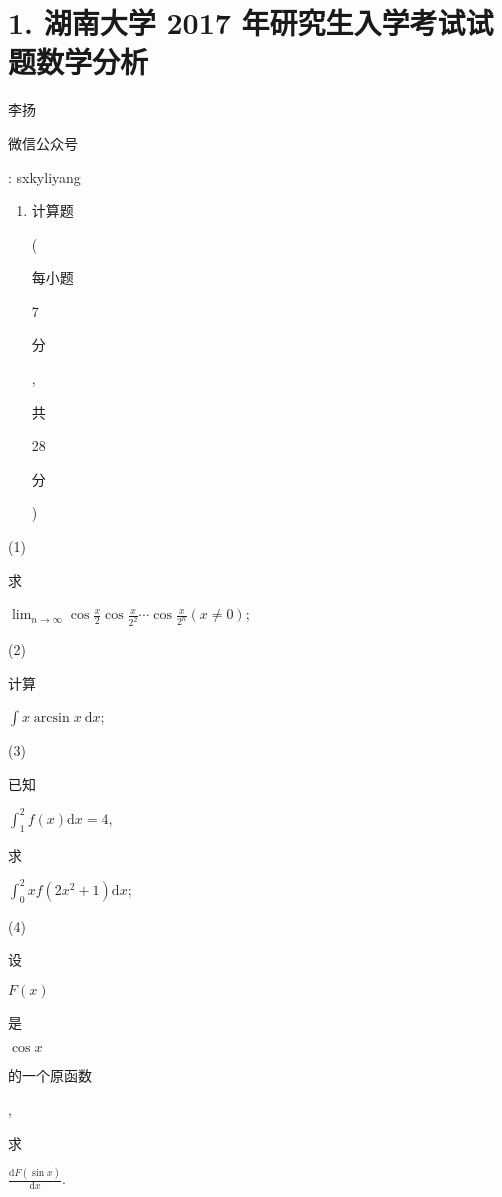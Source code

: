 \documentclass[10pt]{article}
\begin{document}
\section{1. 湖南大学 2017 年研究生入学考试试题数学分析}
\begin{CJK}{UTF8}{mj}李扬\end{CJK}

\begin{CJK}{UTF8}{mj}微信公众号\end{CJK}: sxkyliyang

\begin{enumerate}
  \item \begin{CJK}{UTF8}{mj}计算题\end{CJK}(\begin{CJK}{UTF8}{mj}每小题\end{CJK} 7 \begin{CJK}{UTF8}{mj}分\end{CJK}, \begin{CJK}{UTF8}{mj}共\end{CJK} 28 \begin{CJK}{UTF8}{mj}分\end{CJK})
\end{enumerate}
(1) \begin{CJK}{UTF8}{mj}求\end{CJK} $\lim _{n \rightarrow \infty} \cos \frac{x}{2} \cos \frac{x}{2^{2}} \cdots \cos \frac{x}{2^{n}}(x \neq 0)$;

(2) \begin{CJK}{UTF8}{mj}计算\end{CJK} $\int x \arcsin x \mathrm{~d} x$;

(3) \begin{CJK}{UTF8}{mj}已知\end{CJK} $\int_{1}^{2} f(x) \mathrm{d} x=4$, \begin{CJK}{UTF8}{mj}求\end{CJK} $\int_{0}^{2} x f\left(2 x^{2}+1\right) \mathrm{d} x$;

(4) \begin{CJK}{UTF8}{mj}设\end{CJK} $F(x)$ \begin{CJK}{UTF8}{mj}是\end{CJK} $\cos x$ \begin{CJK}{UTF8}{mj}的一个原函数\end{CJK}, \begin{CJK}{UTF8}{mj}求\end{CJK} $\frac{\mathrm{d} F(\sin x)}{\mathrm{d} x}$.
\end{document}
